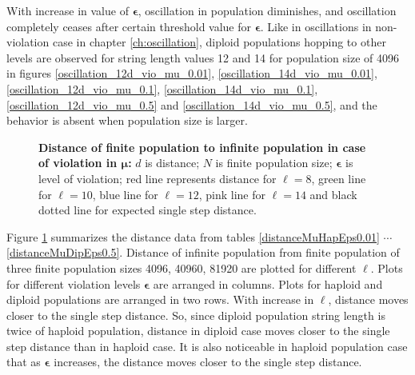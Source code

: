 With increase in value of $\bm{\epsilon}$, 
oscillation in population diminishes, and oscillation completely ceases after certain threshold value for $\bm{\epsilon}$. 
Like in oscillations in non-violation case in chapter \ref{ch:oscillation}, diploid populations hopping to other levels 
are observed for string length values 12 and 14 for population size of 4096 in 
figures \ref{oscillation_12d_vio_mu_0.01}, \ref{oscillation_14d_vio_mu_0.01}, \ref{oscillation_12d_vio_mu_0.1}, 
\ref{oscillation_14d_vio_mu_0.1}, \ref{oscillation_12d_vio_mu_0.5} and \ref{oscillation_14d_vio_mu_0.5}, 
and the behavior is absent when population size is larger.

\begin{figure}[h]
\begin{center}
\hspace{-3em}%
\caption[\textbf{Distance of finite population to infinite population in case of violation in $\bm{\mu}$}]{\textbf{Distance of finite population to infinite population in case of violation in $\bm{\mu}$:}  
  $d$ is distance; $N$ is finite population size; $\bm{\epsilon}$ is level of violation;
  red line represents distance for $\ell = 8$, green line for $\ell = 10$, blue line for $\ell = 12$, pink line for $\ell = 14$ 
  and black dotted line for expected single step distance.}
\label{vio_mu_dist}
\end{center}
\end{figure}
Figure \ref{vio_mu_dist} summarizes the distance data from tables \ref{distanceMuHapEps0.01} $\cdots$ 
\ref{distanceMuDipEps0.5}. Distance of infinite population from finite population of 
three finite population sizes {4096, 40960, 81920} are plotted for different $\ell$. 
Plots for different violation levels $\bm{\epsilon}$ are arranged in columns. 
Plots for haploid and diploid populations are arranged in two rows. With increase in $\ell$, 
distance moves closer to the single step distance. So, since diploid population 
string length is twice of haploid population, 
distance in diploid case moves closer to the single step distance than in haploid case. 
It is also noticeable in haploid population case that as $\bm{\epsilon}$ increases, 
the distance moves closer to the single step distance.

